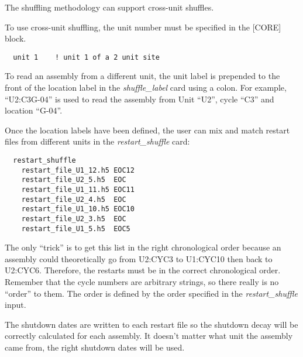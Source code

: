 The shuffling methodology can support cross-unit shuffles.

To use cross-unit shuffling, the unit number must be specified in the [CORE] block.
\begin{verbatim}
  unit 1    ! unit 1 of a 2 unit site
\end{verbatim}

To read an assembly from a different unit, the unit label is prepended to the front of the location label
in the {\it shuffle\_label} card using a colon.
For example, ``U2:C3G-04'' is used to read the assembly from Unit ``U2'', cycle ``C3'' and location ``G-04''.

Once the location labels have been defined, the user can mix and match restart files from different units
in the {\it restart\_shuffle} card:
\begin{verbatim}
  restart_shuffle
    restart_file_U1_12.h5 EOC12
    restart_file_U2_5.h5  EOC
    restart_file_U1_11.h5 EOC11
    restart_file_U2_4.h5  EOC
    restart_file_U1_10.h5 EOC10
    restart_file_U2_3.h5  EOC
    restart_file_U1_5.h5  EOC5
\end{verbatim}
The only ``trick'' is to get this list in the right chronological order because an
assembly could theoretically go from U2:CYC3 to U1:CYC10 then back to U2:CYC6.  Therefore, the restarts
must be in the correct chronological order.  Remember that the cycle numbers are arbitrary strings,
so there really is no ``order'' to them.  The order is defined by the order specified in the
{\it restart\_shuffle} input.

The shutdown dates are written to each restart file so the shutdown decay will be correctly
calculated for each assembly.
It doesn't matter what unit the assembly came from, the right shutdown dates will be used.


